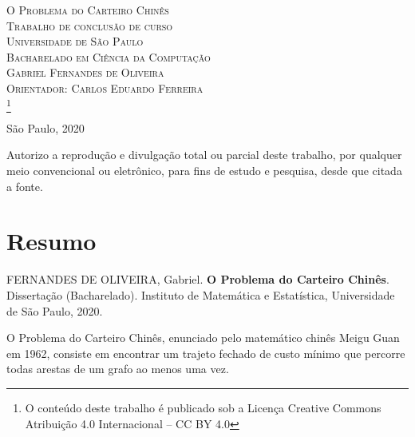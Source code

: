 \documentclass[12pt,twoside,english,brazilian]{book}
\newcommand\blfootnote[1]{%
  \begingroup
  \renewcommand\thefootnote{}\footnote{#1}%
  \addtocounter{footnote}{-1}%
  \endgroup
}
\begin{document}
\frontmatter

\pagestyle{plain}


\thispagestyle{empty}


\begin{center}
    \Large \textsc{O Problema do Carteiro Chinês} \\[120pt]
    \large \textsc{Trabalho de conclusão de curso} \\
    \large \textsc{Universidade de São Paulo} \\
    \large \textsc{Bacharelado em Ciência da Computação}\\[120pt]
    \large \textsc{Gabriel Fernandes de Oliveira} \\
    \large \textsc{Orientador: Carlos Eduardo Ferreira}\\
    \blfootnote{O conteúdo deste trabalho é publicado sob a Licença Creative Commons Atribuição 4.0 Internacional – CC BY 4.0}
    \vfill
    \normalsize{São Paulo, 2020}

\end{center}


\newpage 

Autorizo a reprodução e divulgação total ou parcial deste trabalho, por qualquer meio convencional ou eletrônico, para fins de estudo e pesquisa, desde que citada a fonte.

\chapter*{Resumo}

FERNANDES DE OLIVEIRA, Gabriel. \textbf{O Problema do Carteiro Chinês}. Dissertação (Bacharelado). Instituto de Matemática e Estatística, Universidade de São Paulo, 2020.

\vspace{10pt}

O Problema do Carteiro Chinês, enunciado pelo matemático chinês Meigu Guan em 1962, consiste em encontrar um trajeto fechado de custo mínimo que percorre todas arestas de um grafo ao menos uma vez.
\end{document}
